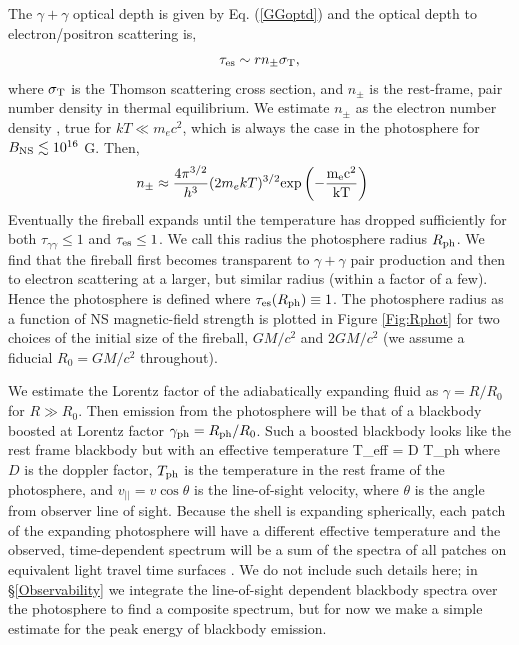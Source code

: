 The $\gamma + \gamma$ optical depth is given by Eq. (\ref{GGoptd}) and
the optical depth to electron/positron scattering is,
\begin{equation}
\tau_{\rm{es}} \sim r n_{\pm} \sigma_{\rm{T}}, 
\end{equation}
where $\sigma_{\rm{T}}$ is the Thomson scattering cross section, and
$n_{\pm}$ is the rest-frame, pair number density in thermal
equilibrium. We estimate $n_{\pm}$ as the electron number density
\citep[{\em e.g.},][]{Pacz:1986GRB}, true for $kT \ll m_e c^2$, which
is always the case in the photosphere for $B_{\rm{NS}} \lesssim 10^{16}$
G. Then,
\begin{align}
\label{Eq:npm}
n_{\pm} &\approx \frac{4 \pi^{3/2}}{h^3} (2 m_e k T)^{3/2} \rm{exp}\left(- \frac{m_e c^2}{k T}\right) 
\end{align}
Eventually the fireball expands until the temperature has dropped
sufficiently for both $\tau_{\gamma \gamma} \leq 1$ and $\tau_{\rm es}
\leq1$. We call this radius the photosphere radius $R_{\rm{ph}}$. We
find that the fireball first becomes transparent to $\gamma + \gamma$
pair production and then to electron scattering at a larger, but
similar radius (within a factor of a few). Hence the photosphere is
defined where $\tau_{\rm es}(R_{\rm{ph}}) \equiv 1$. The photosphere
radius as a function of NS magnetic-field strength is plotted in
Figure \ref{Fig:Rphot} for two choices of the initial size of the
fireball, $GM/c^2$ and $2GM/c^2$ (we assume a fiducial $R_0=GM/c^2$
throughout).






We estimate the Lorentz factor of the adiabatically expanding fluid as
$\gamma = R/R_0$ \citep{Pacz:1986GRB} for $R\gg R_0$.  Then emission
from the photosphere will be that of a blackbody boosted at Lorentz
factor $\gamma_{\rm{ph}} = R_{\rm{ph}}/R_0$. Such a boosted blackbody
looks like the rest frame blackbody but with an effective temperature
\be 
T_{\rm eff} =  \equiv D T_{\rm{ph}}
\label{Eq:Teff}
\ee where $D$ is the doppler factor, $T_{\rm{ph}}$ is the temperature
in the rest frame of the photosphere, and $v_{||} = v\cos{\theta}$ is
the line-of-sight velocity, where $\theta$ is the angle from observer
line of sight. Because the shell is expanding spherically, each patch
of the expanding photosphere will have a different effective
temperature and the observed, time-dependent spectrum will be a sum of
the spectra of all patches on equivalent light travel time surfaces
\citep[{\em e.g.},][]{Pe'er:2011}. We do not include such details
here; in \S \ref{Observability} we integrate the line-of-sight
dependent blackbody spectra over the photosphere to find a composite
spectrum, but for now we make a simple estimate for the peak energy of
blackbody emission.

